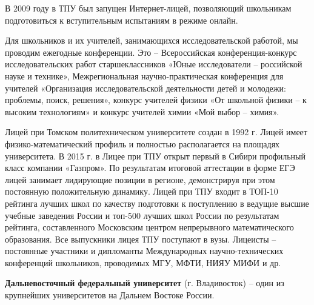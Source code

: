 В 2009 году в ТПУ был запущен Интернет-лицей, позволяющий школьникам подготовиться к вступительным испытаниям в режиме онлайн.

Для школьников и их учителей, занимающихся исследовательской работой, мы проводим ежегодные конференции. Это – Всероссийская конференция-конкурс исследовательских работ старшеклассников «Юные исследователи – российской науке и технике», Межрегиональная научно-практическая конференция для учителей «Организация исследовательской деятельности детей и молодежи: проблемы, поиск, решения»,  конкурс учителей физики «От школьной физики – к высоким технологиям» и конкурс учителей химии «Мой выбор – химия».

Лицей при Томском политехническом университете создан в 1992 г. Лицей имеет физико-математический профиль и полностью располагается на площадях университета. В  2015 г.  в Лицее при ТПУ открыт первый в Сибири профильный класс компании «Газпром». По результатам итоговой аттестации в форме ЕГЭ  лицей занимает лидирующие позиции в регионе, демонстрируя при этом постоянную положительную динамику. Лицей при ТПУ входит  в ТОП-10  рейтинга лучших школ по качеству подготовки к поступлению в ведущие высшие учебные заведения России и топ-500 лучших школ России по результатам рейтинга, составленного Московским центром непрерывного математического образования. Все выпускники лицея ТПУ поступают в вузы. Лицеисты – постоянные участники и дипломанты Международных научно-технических конференций школьников, проводимых МГУ, МФТИ, НИЯУ МИФИ и др.

\textbf{Дальневосточный федеральный университет} (г. Владивосток) – один из крупнейших университетов на Дальнем Востоке России.

